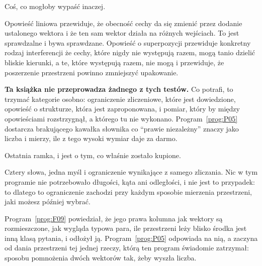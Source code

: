 \begin{fr}
\begin{ansblock}
Coś, co mogłoby wypaść inaczej.
\end{ansblock}

Opowieść liniowa przewiduje, że obecność cechy da się zmienić przez dodanie
ustalonego wektora i że ten sam wektor działa na różnych wejściach. To jest
sprawdzalne i bywa sprawdzane. Opowieść o superpozycji przewiduje konkretny
rodzaj interferencji \dash{} że cechy, które nigdy nie występują razem, mogą
tanio dzielić bliskie kierunki, a te, które występują razem, nie mogą \dash{} i
przewiduje, że poszerzenie przestrzeni powinno zmniejszyć upakowanie.

\begin{rigourbox}
\textbf{Ta książka nie przeprowadza żadnego z tych testów.} Co potrafi, to
trzymać kategorie osobno: ograniczenie zliczeniowe, które jest dowiedzione,
opowieść o strukturze, która jest zaproponowana, i pomiar, który by między
opowieściami rozstrzygnął, a którego tu nie wykonano.
Program~\ref{prog:P05} dostarcza brakującego kawałka słownika \dash{} co
\enquote{prawie niezależny} znaczy jako liczba \dash{} i mierzy, ile z tego
wysoki wymiar daje za darmo.
\end{rigourbox}
\end{fr}

\begin{fr}
Ostatnia ramka, i jest o tym, co właśnie zostało kupione.

Cztery słowa, jedna myśl i ograniczenie wynikające z samego zliczania. Nic w
tym programie nie potrzebowało długości, kąta ani odległości, i nie jest to
przypadek: to dlatego to ograniczenie zachodzi przy każdym sposobie mierzenia
przestrzeni, jaki możesz później wybrać.

Program~\ref{prog:F09} powiedział, że jego prawa kolumna \dash{} jak wektory są
rozmieszczone, jak wygląda typowa para, ile przestrzeni leży blisko środka
\dash{} jest inną klasą pytania, i odłożył ją. Program~\ref{prog:P05}
odpowiada na nią, a zaczyna od dania przestrzeni tej jednej rzeczy, którą ten
program świadomie zatrzymał: sposobu pomnożenia dwóch wektorów tak, żeby wyszła
liczba.
\end{fr}

